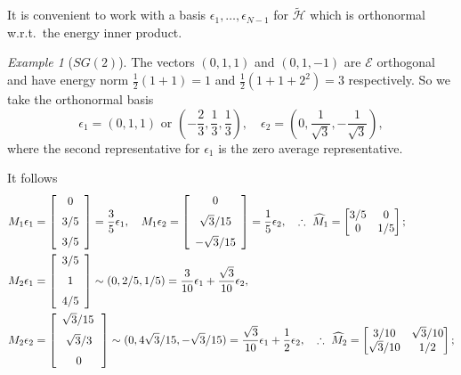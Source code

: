 \documentclass[a4paper]{amsart}
\theoremstyle{plain}
\theoremstyle{definition}
\theoremstyle{remark}
\newtheorem{example}[theorem]{Example}
\begin{document}
It is convenient to work with a  basis $ \epsilon_1, \dots, \epsilon_{N-1} $ for   $ \widetilde{\mathcal{H}}$ which is orthonormal w.r.t.\ the energy inner product.
\begin{example}[$ SG(2) $]  The vectors $ (0,1,1) $ and $ (0,1,-1) $ are $ \mathcal{E} $ orthogonal and have energy norm $ \frac{1}{2} (1+1) = 1 $ and $ \frac{1}{2} (1+1+2^2) =3$ respectively.   
So we take the orthonormal basis  
\[  
\epsilon_1 = (0,1,1) \text{ or } \left(-\frac{2}{3} ,\frac{1}{3}, \frac{1}{3} \right), \quad 
\epsilon_2 =  \left(0, \frac{1}{\sqrt{3}}, -\frac{1}{\sqrt{3}}\right),
\]
where the second   representative for $ \epsilon_1 $ is the zero average representative.

It follows
\begin{align*}
M_1 \epsilon_1  &= \left[ \begin {array}{c} 0\\\noalign{\medskip}3/5\\\noalign{\medskip}
3/5\end {array} \right] =     \frac{3}{5} \epsilon_1, \quad 
M_1 \epsilon_2  =  \left[ \begin {array}{c} 0\\\noalign{\medskip}\sqrt {3}/15 
\\\noalign{\medskip}-\sqrt {3}/15 \end {array} \right] = \frac{1}{5} \epsilon _2, \quad 
\therefore\ \widehat{M}_1  = \begin{bmatrix} 3/5 & 0 \\ 0  & 1/5 \end{bmatrix};
\\
M_2 \epsilon_1  &=  \left[ \begin {array}{c} 3/5\\\noalign{\medskip}1\\\noalign{\medskip}
4/5\end {array} \right] \sim (0,2/5, 1/5) = \frac{3}{10}\epsilon_1 + \frac{\sqrt{3}}{10} \epsilon_2,
\\
M_2 \epsilon_2  &=   \left[ \begin {array}{c} \sqrt {3}/15\,\\\noalign{\medskip}\sqrt {3}/3
\\\noalign{\medskip}0\end {array} \right] \sim (0,  4\sqrt{3}/15,-\sqrt{3}/15) =
\frac{\sqrt{3}}{10} \epsilon _1 + \frac{1}{2} \epsilon_2,
\quad 
\therefore\ \widehat{M}_2  = \begin{bmatrix} 3/10 & \sqrt{3}/10 \\ \sqrt{3}/10  & 1/2 \end{bmatrix};

\end{align*}
\end{example}
\end{document}
